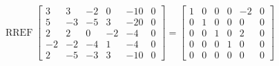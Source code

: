 \begin{exerciseAnswer} 


\[\operatorname{RREF} \left[\begin{array}{ccccc|c}
3 & 3 & -2 & 0 & -10 & 0 \\
5 & -3 & -5 & 3 & -20 & 0 \\
2 & 2 & 0 & -2 & -4 & 0 \\
-2 & -2 & -4 & 1 & -4 & 0 \\
2 & -5 & -3 & 3 & -10 & 0
\end{array}\right] = \left[\begin{array}{ccccc|c}
1 & 0 & 0 & 0 & -2 & 0 \\
0 & 1 & 0 & 0 & 0 & 0 \\
0 & 0 & 1 & 0 & 2 & 0 \\
0 & 0 & 0 & 1 & 0 & 0 \\
0 & 0 & 0 & 0 & 0 & 0
\end{array}\right] \]



\end{exerciseAnswer}
